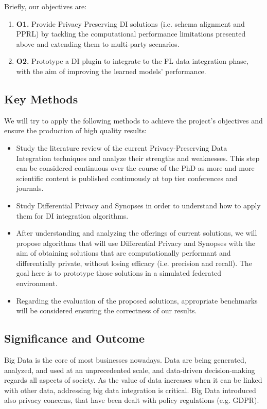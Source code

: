 \documentclass[12pt]{article}
\begin{document}
Briefly, our objectives are:
\begin{enumerate}
   \item \textbf{O1.} Provide Privacy Preserving DI solutions (i.e. schema alignment and PPRL) by tackling the computational performance limitations 
   presented above and extending them to multi-party scenarios.
   \item \textbf{O2.} Prototype a DI plugin to integrate to the FL data integration phase, with the aim of improving the 
   learned models' performance.
\end{enumerate}

\subsection{Key Methods}
We will try to apply the following methods to achieve the
project's objectives and ensure the production of high quality results:
\begin{itemize}
   \item Study the literature review of the current Privacy-Preserving Data Integration techniques and analyze their strengths 
   and weaknesses. This step can be considered continuous over the course of the PhD as more and more scientific content is 
   published continuously at top tier conferences and journals.%
   \item Study Differential Privacy and Synopses in order to understand how to apply them for DI integration algorithms.
   \item After understanding and analyzing the offerings of current solutions, we will propose algorithms that will 
   use Differential Privacy and Synopses with the aim of obtaining solutions that are computationally performant and differentially 
   private, without losing efficacy (i.e. precision and recall). 
   The goal here is to prototype those solutions in a simulated federated environment.
   \item Regarding the evaluation of the proposed solutions, appropriate benchmarks will be considered
   ensuring the correctness of our results.
\end{itemize}

\subsection{Significance and Outcome}
Big Data is the core of most businesses nowadays. Data are being generated, analyzed, and used at an unprecedented scale, 
and data-driven decision-making regards all aspects of society. As the value of data increases when it can be linked with other 
data, addressing big data integration is critical. Big Data introduced also privacy concerns, that have been dealt with policy 
regulations (e.g. GDPR).
\end{document}
